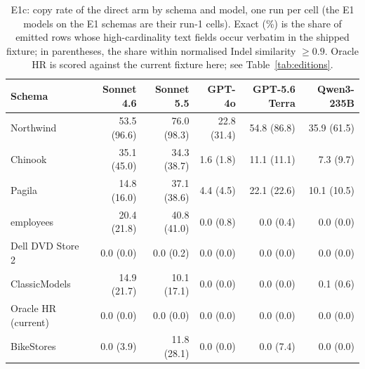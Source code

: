 \documentclass[preprint,12pt]{elsarticle}
\begin{document}
\begin{table}[t]
\centering\small
\caption{E1c: copy rate of the direct arm by schema and model, one run per cell (the E1 models on the E1 schemas are their run-1 cells). Exact (\%) is the share of emitted rows whose high-cardinality text fields occur verbatim in the shipped fixture; in parentheses, the share within normalised Indel similarity $\geq 0.9$. Oracle HR is scored against the current fixture here; see Table~\ref{tab:editions}.}
\label{tab:copymodels}
\setlength{\tabcolsep}{4pt}
\begin{tabular}{lrrrrr}
\toprule
Schema & Sonnet 4.6 & Sonnet 5.5 & GPT-4o & GPT-5.6 Terra & Qwen3-235B \\
\midrule
Northwind & 53.5 (96.6) & 76.0 (98.3) & 22.8 (31.4) & 54.8 (86.8) & 35.9 (61.5) \\
Chinook & 35.1 (45.0) & 34.3 (38.7) & 1.6 (1.8) & 11.1 (11.1) & 7.3 (9.7) \\
Pagila & 14.8 (16.0) & 37.1 (38.6) & 4.4 (4.5) & 22.1 (22.6) & 10.1 (10.5) \\
employees & 20.4 (21.8) & 40.8 (41.0) & 0.0 (0.8) & 0.0 (0.4) & 0.0 (0.0) \\
Dell DVD Store 2 & 0.0 (0.0) & 0.0 (0.2) & 0.0 (0.0) & 0.0 (0.0) & 0.0 (0.0) \\
ClassicModels & 14.9 (21.7) & 10.1 (17.1) & 0.0 (0.0) & 0.0 (0.0) & 0.1 (0.6) \\
Oracle HR (current) & 0.0 (0.0) & 0.0 (0.0) & 0.0 (0.0) & 0.0 (0.0) & 0.0 (0.0) \\
BikeStores & 0.0 (3.9) & 11.8 (28.1) & 0.0 (0.0) & 0.0 (7.4) & 0.0 (0.0) \\
\bottomrule
\end{tabular}
\end{table}
\end{document}
